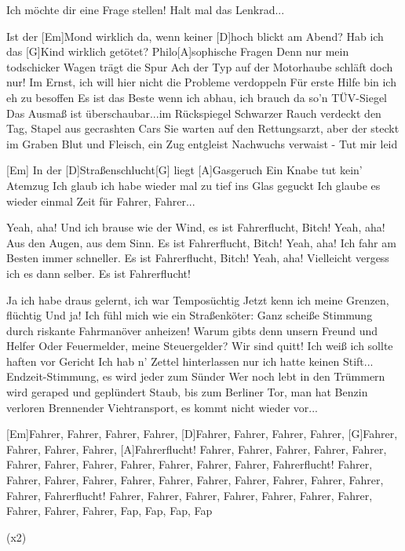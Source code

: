 

\begin{guitar}
	Ich möchte dir eine Frage stellen!
	Halt mal das Lenkrad...
	
	Ist der [Em]Mond wirklich da, wenn keiner [D]hoch blickt am Abend?
	Hab ich das [G]Kind wirklich getötet? Philo[A]sophische Fragen
	Denn nur mein todschicker Wagen trägt die Spur
	Ach der Typ auf der Motorhaube schläft doch nur!
	Im Ernst, ich will hier nicht die Probleme verdoppeln
	Für erste Hilfe bin ich eh zu besoffen
	Es ist das Beste wenn ich abhau, ich brauch da so'n TÜV-Siegel
	Das Ausmaß ist überschaubar...im Rückspiegel
	Schwarzer Rauch verdeckt den Tag, Stapel aus gecrashten Cars
	Sie warten auf den Rettungsarzt, aber der steckt im Graben
	Blut und Fleisch, ein Zug entgleist
	Nachwuchs verwaist - Tut mir leid
	
	[Em] In der [D]Straßenschlucht[G] liegt [A]Gasgeruch
	Ein Knabe tut kein' Atemzug
	Ich glaub ich habe wieder mal zu tief ins Glas geguckt
	Ich glaube es wieder einmal Zeit für Fahrer, Fahrer...
	
	Yeah, aha! Und ich brause wie der Wind, es ist Fahrerflucht, Bitch!
	Yeah, aha! Aus den Augen, aus dem Sinn. Es ist Fahrerflucht, Bitch!
	Yeah, aha! Ich fahr am Besten immer schneller. Es ist Fahrerflucht, Bitch!
	Yeah, aha! Vielleicht vergess ich es dann selber. Es ist Fahrerflucht!
	
	\pagebreak
	Ja ich habe draus gelernt, ich war Temposüchtig
	Jetzt kenn ich meine Grenzen, flüchtig
	Und ja! Ich fühl mich wie ein Straßenköter: Ganz scheiße
	Stimmung durch riskante Fahrmanöver anheizen!
	Warum gibts denn unsern Freund und Helfer
	Oder Feuermelder, meine Steuergelder?
	Wir sind quitt! Ich weiß ich sollte haften vor Gericht
	Ich hab n' Zettel hinterlassen nur ich hatte keinen Stift...
	Endzeit-Stimmung, es wird jeder zum Sünder
	Wer noch lebt in den Trümmern wird geraped und geplündert
	Staub, bis zum Berliner Tor, man hat Benzin verloren
	Brennender Viehtransport, es kommt nicht wieder vor...
	
	 
	
	 
	
	[Em]Fahrer, Fahrer, Fahrer, Fahrer, [D]Fahrer, Fahrer, Fahrer, Fahrer,
	[G]Fahrer, Fahrer, Fahrer, Fahrer, [A]Fahrerflucht!
	Fahrer, Fahrer, Fahrer, Fahrer, Fahrer, Fahrer, Fahrer, Fahrer,
	Fahrer, Fahrer, Fahrer, Fahrer, Fahrerflucht!
	Fahrer, Fahrer, Fahrer, Fahrer, Fahrer, Fahrer, Fahrer, Fahrer,
	Fahrer, Fahrer, Fahrer, Fahrer, Fahrerflucht!
	Fahrer, Fahrer, Fahrer, Fahrer, Fahrer, Fahrer, Fahrer, Fahrer,
	Fahrer, Fahrer, Fap, Fap, Fap, Fap
	
	  (x2)
\end{guitar}